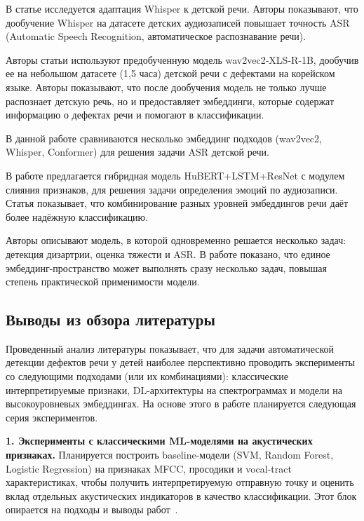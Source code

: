 \documentclass[a4paper,14pt]{extarticle}
\begin{document}
В статье \textbf{\cite{jain2023_whisper_child_speech}} исследуется адаптация Whisper к детской речи. Авторы показывают, что дообучение Whisper на датасете детских аудиозаписей повышает точность ASR (Automatic Speech Recognition, автоматическое распознавание речи).

Авторы статьи \textbf{\cite{usefulness_asr_ssd_2025}} используют предобученную модель wav2vec2‑XLS‑R‑1B, дообучив ее на небольшом датасете (1,5 часа) детской речи с дефектами на корейском языке. Авторы показывают, что после дообучения модель не только лучше распознает детскую речь, но и предоставляет эмбеддинги, которые содержат информацию о дефектах речи и помогают в классификации.

В данной работе \textbf{\cite{asr_screening_children_2024}} сравниваются несколько эмбеддинг подходов (wav2vec2, Whisper, Conformer) для решения задачи ASR детской речи.

В работе \textbf{\cite{huang2024_hybrid_module_transformer}} предлагается гибридная модель HuBERT+LSTM+ResNet с модулем слияния признаков, для решения задачи определения эмоций по аудиозаписи. Статья показывает, что комбинирование разных уровней эмбеддингов речи даёт более надёжную классификацию.

Авторы \textbf{\cite{raghu2025_multilingual_dysarthria}} описывают модель, в которой одновременно решается несколько задач: детекция дизартрии, оценка тяжести и ASR. В работе показано, что единое эмбеддинг-пространство может выполнять сразу несколько задач, повышая степень практической применимости модели.

\subsection{Выводы из обзора литературы}

Проведенный анализ литературы показывает, что для задачи автоматической детекции дефектов речи у детей наиболее перспективно проводить эксперименты со следующими подходами (или их комбинациями): классические интерпретируемые признаки, DL-архитектуры на спектрограммах и модели на высокоуровневых эмбеддингах. На основе этого в работе планируется следующая серия экспериментов.

\textbf{1. Эксперименты с классическими ML-моделями на акустических признаках.}
Планируется построить baseline-модели (SVM, Random Forest, Logistic Regression) на признаках MFCC, просодики и vocal-tract характеристиках, чтобы получить интерпретируемую отправную
точку и оценить вклад отдельных акустических индикаторов в качество классификации. Этот блок опирается на подходы и выводы работ~\cite{methods_defective_speech_rus,su2018_acoustic_predictors_pediatric_dysarthria,ng2022_child_ssd_posterior}.
\end{document}

